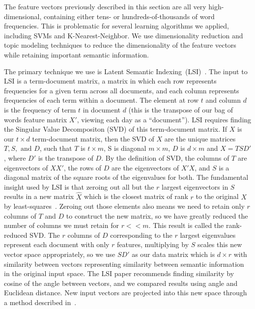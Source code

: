 \documentclass[10pt, twocolumn]{article}
\begin{document}
The feature vectors previously described in this section are all very high-dimensional, containing either tens- or hundreds-of-thousands of word frequencies. This is problematic for several learning algorithms we applied, including SVMs and K-Nearest-Neighbor. We use dimensionality reduction and topic modeling techniques to reduce the dimensionality of the feature vectors while retaining important semantic information.

The primary technique we use is Latent Semantic Indexing~(LSI)~\cite{lsi}. The input to LSI is a term-document matrix, a matrix in which each row represents frequencies for a given term across all documents, and each column represents frequencies of each term within a document. The element at row $t$ and column $d$ is the frequency of term $t$ in document $d$ (this is the transpose of our bag of words feature matrix $X'$, viewing each day as a ``document''). LSI requires finding the Singular Value Decompositon (SVD) of this term-document matrix. If $X$ is our $t \times d$ term-document matrix, then the SVD of $X$ are the unique matrices $T, S, \text{ and } D$, such that $T$ is $t \times m$, S is diagonal $m \times m$, $D$ is $d \times m$ and $X = T S D'$, where $D'$ is the transpose of $D$. By the definition of SVD, the columns of $T$ are eigenvectors of $X X'$, the rows of $D$ are the eigenvectors of $X' X$, and $S$ is a diagonal matrix of the square roots of the eigenvalues for both. The fundamental insight used by LSI is that zeroing out all but the $r$ largest eigenvectors in $S$ results in a new matrix $\hat{X}$ which is the closest matrix of rank $r$ to the original $X$ by least-squares~\cite{lsi}. Zeroing out those elements also means we need to retain only $r$ columns of $T$ and $D$ to construct the new matrix, so we have greatly reduced the number of columns we must retain for $r << m$. This result is called the rank-reduced SVD. The $r$ columns of $D$ corresponding to the $r$ largest eigenvalues represent each document with only $r$ features, multiplying by $S$ scales this new vector space appropriately, so we use $S D'$ as our data matrix which is $d \times r$ with similarity between vectors representing similarity between semantic information in the original input space. The LSI paper recommends finding similarity by cosine of the angle between vectors, and we compared results using angle and Euclidean distance. New input vectors are projected into this new space through a method described in~\cite{lsi}.
\end{document}
